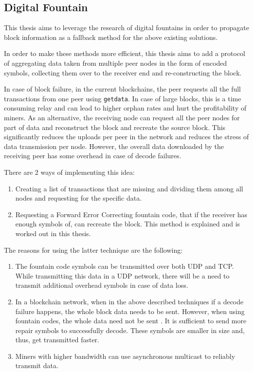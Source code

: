 \subsection{Digital Fountain}

This thesis aims to leverage the research of digital fountains 
\citep{fountain1} \citep{fountain2} \citep{fountain3} \citep{fountain4} in order to
propagate block information as a fallback method for the above existing
solutions.

In order to make these methods more efficient, this thesis aims to add a
protocol of aggregating data taken from multiple peer nodes in the form of encoded
symbols, collecting them over to the receiver end and re-constructing the block.

In case of block failure, in the current blockchains, the peer requests all the
full transactions from one peer using \texttt{getdata}. In case of large blocks, this is
a time consuming relay and can lead to higher orphan rates and hurt the
profitability of miners. As an alternative, the receiving node can request all
the peer nodes for part of data and reconstruct the block and recreate the
source block. This significantly reduces the uploads per peer in the network and
reduces the stress of data transmission per node. However, the overall data
downloaded by the receiving peer has some overhead in case of decode failures.

There are 2 ways of implementing this idea:

\begin{enumerate}
    \item Creating a list of transactions that are missing and dividing them
        among all nodes and requesting for the specific data.
    \item Requesting a Forward Error Correcting fountain code, that if the
        receiver has enough symbols of, can recreate the block. This method is
        explained and is worked out in this thesis.
\end{enumerate}

The reasons for using the latter technique are the following:

\begin{enumerate}
    \item The fountain code symbols can be transmitted over both UDP and TCP.
        While transmitting this data in a UDP network, there will be a need to
        transmit additional overhead symbols in case of data loss. 
    \item In a blockchain network, when in the above described techniques if a decode failure happens, the whole block data needs to be sent. However, when using fountain codes, the whole data need not be sent . It is sufficient to send more repair symbols to successfully decode. These symbols are
        smaller in size and, thus, get transmitted faster. 
    \item Miners with higher bandwidth can use asynchronous multicast to reliably transmit data.
\end{enumerate}

